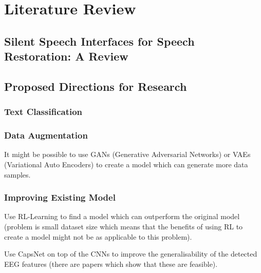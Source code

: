 \iffalse

Mu-Law compression:
- compresses audio signal into discrete bins whilst preserving dynamic range

Current sEMG Silent Speech Text Classification Research:
- https://dspace.mit.edu/bitstream/handle/1721.1/123121/1128187233-MIT.pdf?sequence=1&isAllowed=y

\fi

\chapter{Literature Review} \label{chap:lit-review}

\section{Silent Speech Interfaces for Speech Restoration: A Review}


\section{Proposed Directions for Research}

\subsection{Text Classification}



\subsection{Data Augmentation}

It might be possible to use GANs (Generative Adversarial Networks) or
VAEs (Variational Auto Encoders) to create a model which can generate
more data samples.

\subsection{Improving Existing Model}

Use RL-Learning to find a model which can outperform the original model
(problem is small dataset size which means that the benefits of using RL
to create a model might not be as applicable to this problem).

Use CapsNet on top of the CNNs to improve the generalisability of the
detected EEG features (there are papers which show that these are
feasible).